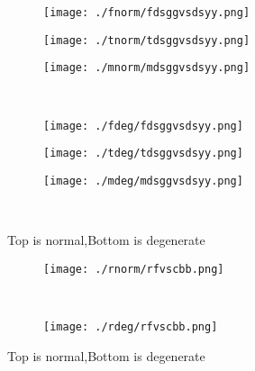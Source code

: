 \documentclass[aps,floats,floatfix,nofootinbib]{revtex4-1}
\begin{document}
\begin{center}
\begin{figure}
\begin{subfigure}{0.3\textwidth}
\texttt{[image: ./fnorm/fdsggvsdsyy.png]}
\label{}
\end{subfigure}
\begin{subfigure}{0.3\textwidth}
\texttt{[image: ./tnorm/tdsggvsdsyy.png]}
\label{}
\end{subfigure}
\begin{subfigure}{0.3\textwidth}
\texttt{[image: ./mnorm/mdsggvsdsyy.png]}
\label{}
\end{subfigure}\\
\begin{subfigure}{0.3\textwidth}
\texttt{[image: ./fdeg/fdsggvsdsyy.png]}
\label{}
\end{subfigure}
\begin{subfigure}{0.3\textwidth}
\texttt{[image: ./tdeg/tdsggvsdsyy.png]}
\label{}
\end{subfigure}
\begin{subfigure}{0.3\textwidth}
\texttt{[image: ./mdeg/mdsggvsdsyy.png]}
\label{}
\end{subfigure}\\
\caption{Top is normal,Bottom is degenerate}
\end{figure}
\end{center}

\begin{center}
\begin{figure}
\begin{subfigure}{0.95\textwidth}
\texttt{[image: ./rnorm/rfvscbb.png]}
\label{}
\end{subfigure}\\
\begin{subfigure}{0.95\textwidth}
\texttt{[image: ./rdeg/rfvscbb.png]}
\label{}
\end{subfigure}
\caption{Top is normal,Bottom is degenerate}
\end{figure}
\end{center}
\end{document}
